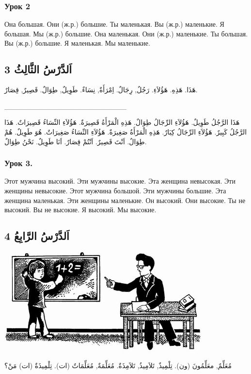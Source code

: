 \documentclass[a5paper]{article}
\begin{document}
\subsubsection{Урок 2}
Она большая. Они (ж.р.) большие. Ты маленькая. Вы (ж.р.) маленькие. Я большая. Мы (ж.р.) большие. Она маленькая. Они (ж.р.) маленькие. Ты большая. Вы (ж.р.) большие. Я маленькая. Мы маленькие.

\subsection{اَلدَّرْسُ الثَّالِثُ 3}
هَذَا. هَذِهِ. هَؤُلاَءِ. رَجُلٌ, رِجَالٌ. اِمْرَأَةٌ, نِسَاءٌ. طَوِيلٌ, طِوَالٌ. قَصِيرٌ, قِصَارٌ.

\_\_\_\_\_\_\_\_\_\_\_\_\_\_\_\_\_\_\_\_\_\_\_\_

هَذَا الرَّجُلُ طَوِيلٌ. هَؤُلاَءِ الرِّجَالُ طِوَالٌ. هَذِهِ الْمَرْأَةُ قَصِيرَةٌ. هَؤُلاَءِ النِّسَاءُ قَصِيرَاتٌ. هَذَا الرَّجُلُ كَبِيرٌ. هَؤُلاَءِ الرِّجَالُ كِبَارٌ. هَذِهِ الْمَرْأَةُ صَغِيرَةٌ. هَؤُلاَءِ النِّسَاءُ صَغِيرَاتٌ. هُوَ طَوِيلٌ. هُمْ طِوَالٌ. اَنْتَ قَصِيرٌ. اَنْتُمْ قِصَارٌ. اَنَا طَوِيلٌ. نَحْنُ طِوَالٌ.

\subsubsection{Урок 3.}
Этот мужчина высокий. Эти мужчины высокие. Эта женщина невысокая. Эти женщины невысокие. Этот мужчина большой. Эти мужчины большие. Эта женщина маленькая. Эти женщины маленькие. Он высокий. Они высокие. Ты не высокий. Вы не высокие. Я высокий. Мы высокие.

\subsection{اَلدَّرْسُ الرَّابِعُ 4}
 \includegraphics[width=4.2398in,height=2.1457in]{images/MuhammadBagauddinprettified-img001.jpg} 

مُعَلِّمٌ, معَلِّمُونَ (ون). تِلْمِيذٌ, تَلاَمِيذُ, تَلاَمِذَةٌ. مُعَلِّمَةٌ, مُعَلِّمَاتٌ (ات). تِلْمِيذَةٌ (ات) مَنْ؟
\end{document}
